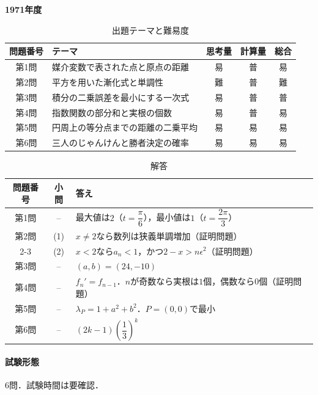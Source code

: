 \documentclass[../../main.tex]{subfiles}
\begin{document}
\begin{center}
  {\fontsize{48pt}{58pt}\selectfont \textbf{1971}\normalsize\textbf{年度}}
\end{center}

\begin{table}[htb]
  \centering
  \caption{出題テーマと難易度}
  \begin{tabular}{|c|p{6.2cm}|c|c|c|}
    \hline
    \textbf{問題番号} & \textbf{テーマ} & \textbf{思考量} & \textbf{計算量} & \textbf{総合} \\
    \hline
    第1問 & 媒介変数で表された点と原点の距離 & 易 & 普 & 易 \\
    \hline
    第2問 & 平方を用いた漸化式と単調性 & 難 & 普 & 難 \\
    \hline
    第3問 & 積分の二乗誤差を最小にする一次式 & 易 & 普 & 普 \\
    \hline
    第4問 & 指数関数の部分和と実根の個数 & 易 & 普 & 易 \\
    \hline
    第5問 & 円周上の等分点までの距離の二乗平均 & 易 & 易 & 易 \\
    \hline
    第6問 & 三人のじゃんけんと勝者決定の確率 & 易 & 易 & 易 \\
    \hline
  \end{tabular}
\end{table}

\begin{table}[htb]
  \centering
  \caption{解答}
  \renewcommand{\arraystretch}{1.4}
  \begin{tabular}{|c|c|p{9cm}|}
    \hline
    \textbf{問題番号} & \textbf{小問} & \textbf{答え} \\
    \hline
    第1問 & -- & 最大値は$2$（$t=\dfrac{\pi}{6}$），最小値は$1$（$t=\dfrac{2\pi}{3}$） \\
    \hline
    第2問 & (1) & $x\ne2$なら数列は狭義単調増加（証明問題） \\
    \cline{2-3}
    & (2) & $x<2$なら$a_n<1$，かつ$2-x>n\epsilon^2$（証明問題） \\
    \hline
    第3問 & -- & $(a,b)=(24,-10)$ \\
    \hline
    第4問 & -- & $f_n'=f_{n-1}$．$n$が奇数なら実根は$1$個，偶数なら$0$個（証明問題） \\
    \hline
    第5問 & -- & $\lambda_P=1+a^2+b^2$．$P=(0,0)$で最小 \\
    \hline
    第6問 & -- & $(2k-1)\left(\dfrac{1}{3}\right)^k$ \\
    \hline
  \end{tabular}
\end{table}

\paragraph{試験形態}
6問．試験時間は要確認．
\end{document}
